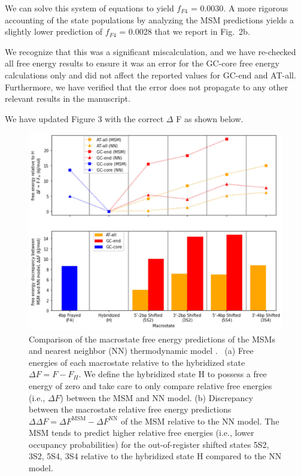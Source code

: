 \documentclass[11pt,a4paper]{letter} %
\newcommand*{\rood}[1]{{\color{red}{#1}}}
\begin{document}
We can solve this system of equations to yield $f_{F4}$ = 0.0030. A more rigorous accounting of the state populations by analyzing the MSM predictions yields a slightly lower prediction of $f_{F4}$ = 0.0028 that we report in Fig.~2b. 

We recognize that this was a significant miscalculation, and we have re-checked all free energy results to ensure it was an error for the GC-core free energy calculations only and did not affect the reported values for GC-end and AT-all. Furthermore, we have verified that the error does not propagate to any other relevant results in the manuscript. 

We have updated Figure 3 with the correct $\Delta$ F  as shown below.

\begin{figure}[ht!]
	\begin{center} 
        \includegraphics[width=160mm, scale=1]{Fig3.pdf}
        \caption{Comparison of the macrostate free energy predictions of the MSMs and nearest neighbor (NN) thermodynamic model \rood{at the sequence melting temperatures}.~\citep{SantaLucia1998AThermodynamics, Santalucia2004TheMotifs} (a) Free energies of each macrostate relative to the hybridized state $\Delta F = F - F_H$. We define the hybridized state H to possess a free energy of zero and take care to only compare relative free energies (i.e., $\Delta F$) between the MSM and NN model. (b) Discrepancy between the macrostate relative free energy predictions $\Delta \Delta F = \Delta F^\mathrm{MSM} - \Delta F^\mathrm{NN}$ of the MSM relative to the NN model. The MSM tends to predict higher relative free energies (i.e., lower occupancy probabilities) for the out-of-register shifted states 5S2, 3S2, 5S4, 3S4 relative to the hybridized state H compared to the NN model.}
        \label{fig:NN_table}
	\end{center}
\end{figure}
\end{document}
